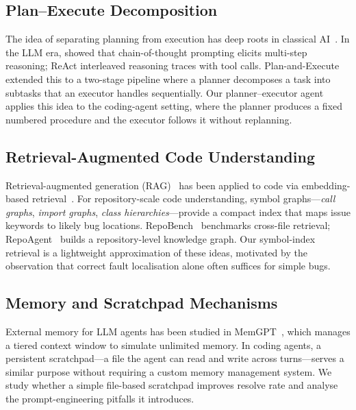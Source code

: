 \documentclass[11pt]{article}
\begin{document}
\subsection{Plan--Execute Decomposition}

The idea of separating planning from execution has deep roots in classical
AI~\citep{fikes1971strips}.  In the LLM era, \citet{wei2022chainofthought}
showed that chain-of-thought prompting elicits multi-step reasoning; ReAct
\citep{yao2023react} interleaved reasoning traces with tool calls.
Plan-and-Execute~\citep{wang2023planandexecute} extended this to a two-stage
pipeline where a planner decomposes a task into subtasks that an executor
handles sequentially.  Our planner--executor agent applies this idea to the
coding-agent setting, where the planner produces a fixed numbered procedure
and the executor follows it without replanning.

\subsection{Retrieval-Augmented Code Understanding}

Retrieval-augmented generation (RAG)~\citep{lewis2020rag} has been applied
to code via embedding-based retrieval~\citep{karpukhin2020dpr}.  For
repository-scale code understanding, symbol graphs---\emph{call graphs},
\emph{import graphs}, \emph{class hierarchies}---provide a compact index
that maps issue keywords to likely bug locations.  RepoBench~\citep{liu2023repobench}
benchmarks cross-file retrieval; RepoAgent~\citep{hong2024repoagent} builds
a repository-level knowledge graph.  Our symbol-index retrieval is a
lightweight approximation of these ideas, motivated by the observation that
correct fault localisation alone often suffices for simple bugs.

\subsection{Memory and Scratchpad Mechanisms}

External memory for LLM agents has been studied in MemGPT~\citep{packer2023memgpt},
which manages a tiered context window to simulate unlimited memory.  In coding
agents, a persistent scratchpad---a file the agent can read and write across
turns---serves a similar purpose without requiring a custom memory management
system.  We study whether a simple file-based scratchpad improves resolve rate
and analyse the prompt-engineering pitfalls it introduces.
\end{document}
